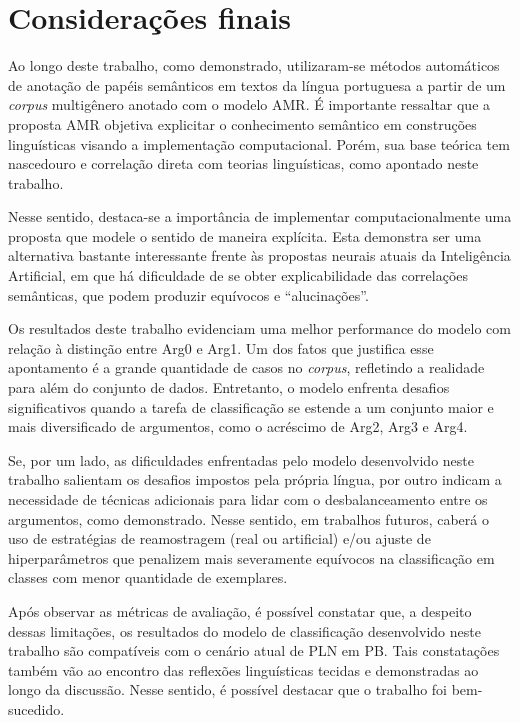 \section{Considerações finais}\label{sec-considerações}

Ao longo deste trabalho, como demonstrado, utilizaram-se métodos
automáticos de anotação de papéis semânticos em textos da língua
portuguesa a partir de um \emph{corpus} multigênero anotado com o modelo
AMR. É importante ressaltar que a proposta AMR objetiva explicitar o
conhecimento semântico em construções linguísticas visando a
implementação computacional. Porém, sua base teórica tem nascedouro e
correlação direta com teorias linguísticas, como apontado neste
trabalho.

Nesse sentido, destaca-se a importância de implementar
computacionalmente uma proposta que modele o sentido de maneira
explícita. Esta demonstra ser uma alternativa bastante interessante
frente às propostas neurais atuais da Inteligência Artificial, em que há
dificuldade de se obter explicabilidade das correlações semânticas, que
podem produzir equívocos e ``alucinações''.

Os resultados deste trabalho evidenciam uma melhor performance do modelo
com relação à distinção entre Arg0 e Arg1. Um dos fatos que justifica
esse apontamento é a grande quantidade de casos no \emph{corpus},
refletindo a realidade para além do conjunto de dados. Entretanto, o
modelo enfrenta desafios significativos quando a tarefa de classificação
se estende a um conjunto maior e mais diversificado de argumentos, como
o acréscimo de Arg2, Arg3 e Arg4.

Se, por um lado, as dificuldades enfrentadas pelo modelo desenvolvido
neste trabalho salientam os desafios impostos pela própria língua, por
outro indicam a necessidade de técnicas adicionais para lidar com o
desbalanceamento entre os argumentos, como demonstrado. Nesse sentido,
em trabalhos futuros, caberá o uso de estratégias de reamostragem (real
ou artificial) e/ou ajuste de hiperparâmetros que penalizem mais
severamente equívocos na classificação em classes com menor quantidade
de exemplares.

Após observar as métricas de avaliação, é possível constatar que, a
despeito dessas limitações, os resultados do modelo de classificação
desenvolvido neste trabalho são compatíveis com o cenário atual de PLN
em PB. Tais constatações também vão ao encontro das reflexões
linguísticas tecidas e demonstradas ao longo da discussão. Nesse
sentido, é possível destacar que o trabalho foi bem-sucedido.

